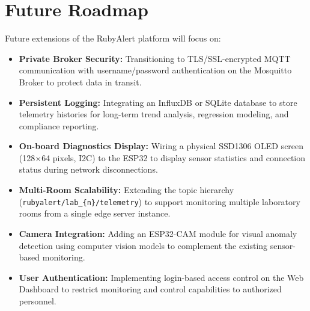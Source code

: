 \documentclass[12pt,a4paper]{report}
\begin{document}
\section{Future Roadmap}
Future extensions of the RubyAlert platform will focus on:
\begin{itemize}[leftmargin=1.5cm]
    \item \textbf{Private Broker Security:} Transitioning to TLS/SSL-encrypted MQTT communication with username/password authentication on the Mosquitto Broker to protect data in transit.
    \item \textbf{Persistent Logging:} Integrating an InfluxDB or SQLite database to store telemetry histories for long-term trend analysis, regression modeling, and compliance reporting.
    \item \textbf{On-board Diagnostics Display:} Wiring a physical SSD1306 OLED screen (128$\times$64 pixels, I2C) to the ESP32 to display sensor statistics and connection status during network disconnections.
    \item \textbf{Multi-Room Scalability:} Extending the topic hierarchy (\texttt{rubyalert/lab\_\{n\}/}\allowbreak\texttt{telemetry}) to support monitoring multiple laboratory rooms from a single edge server instance.
    \item \textbf{Camera Integration:} Adding an ESP32-CAM module for visual anomaly detection using computer vision models to complement the existing sensor-based monitoring.
    \item \textbf{User Authentication:} Implementing login-based access control on the Web Dashboard to restrict monitoring and control capabilities to authorized personnel.
\end{itemize}
\end{document}
